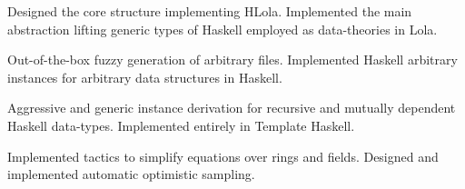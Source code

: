     \divider

    Designed the core structure implementing HLola.
    Implemented the main abstraction lifting generic types of Haskell
employed as data-theories in Lola.

    \divider

        Out-of-the-box fuzzy generation of arbitrary files.
        Implemented Haskell arbitrary instances for arbitrary data
                structures in Haskell.

    \divider

    Aggressive and generic instance derivation for recursive and mutually
dependent Haskell data-types.
    Implemented entirely in Template Haskell.

    \divider
    Implemented tactics to simplify equations over rings and fields.
    Designed and implemented automatic optimistic sampling.

